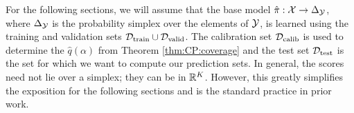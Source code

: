 %
For the following sections, we will assume that the base model $\hat{\pi}: {\mathcal{X}} \to \Delta_{{\mathcal{Y}}}$, where $\Delta_{{\mathcal{Y}}}$ is the probability simplex over the elements of ${\mathcal{Y}}$, is learned using the training and validation sets $\mathcal{D_{\mathrm{train}}} \cup \mathcal{D_{\mathrm{valid}}}$. 
The calibration set $\mathcal{D_{\mathrm{calib}}}$ is used to determine the $\hat{q}(\alpha)$ from Theorem \ref{thm:CP:coverage} and the test set $\mathcal{D_{\mathrm{test}}}$ is the set for which we want to compute our prediction sets.
In general, the scores need not lie over a simplex; they can be in $\mathbb{R}^K$.
However, this greatly simplifies the exposition for the following sections and is the standard practice in prior work.

